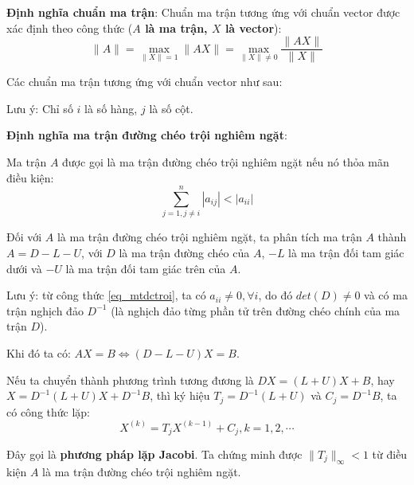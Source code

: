 \documentclass[12pt]{article}
\begin{document}
\newpage{}

\textbf{Định nghĩa chuẩn ma trận}: Chuẩn ma trận tương ứng với chuẩn vector được xác định theo công thức (\textbf{$A$ là ma trận, $X$ là vector}):
\begin{equation}
\|A\| = \max_{\|X\|=1}\|AX\| = \max_{\|X\| \neq 0} \frac{\|AX\|}{\|X\|} 
\end{equation}

Các chuẩn ma trận tương ứng với chuẩn vector như sau:

Lưu ý: Chỉ số $i$ là số hàng, $j$ là số cột.

\newpage{}

\textbf{Định nghĩa ma trận đường chéo trội nghiêm ngặt}:

Ma trận $A$ được gọi là ma trận đường chéo trội nghiêm ngặt nếu nó thỏa mãn điều kiện:
\begin{equation}\label{eq_mtdctroi}
 \sum_{j=1,j\neq i}^n |a_{ij}|<|a_{ii}|
\end{equation}

Đối với $A$ là  ma trận đường chéo trội nghiêm ngặt, ta phân tích ma trận $A$ thành $A=D-L-U$, với $D$ là ma trận đường chéo của $A$, $-L$ là ma trận đối tam giác dưới và $-U$ là ma trận đối tam giác trên của $A$.

Lưu ý: từ công thức \eqref{eq_mtdctroi}, ta có $a_{ii} \neq 0, \forall i$, do đó $det(D) \neq 0$ và có ma trận nghịch đảo $D^{-1}$ (là nghịch đảo từng phần tử trên đường chéo chính của ma trận $D$).

\newpage{}

Khi đó ta có: $AX=B \Leftrightarrow (D-L-U)X=B$.

Nếu ta chuyển thành phương trình tương đương là $DX = (L+U)X+B$, hay $X=D^{-1}(L+U)X+D^{-1}B$, thì ký hiệu $T_j=D^{-1}(L+U)$ và $C_j=D^{-1}B$, ta có công thức lặp:
\begin{equation}
X^{(k)}=T_j X^{(k-1)}+C_j, k=1, 2, \cdots
\end{equation}

Đây gọi là \textbf{phương pháp lặp Jacobi}. Ta chứng minh được $\|T_j\|_\infty<1$ từ điều kiện $A$ là ma trận đường chéo trội nghiêm ngặt.
\end{document}
